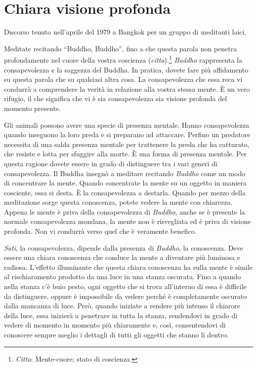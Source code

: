 \chapter{Chiara visione profonda}

\begin{openingQuote}
  \centering

  Discorso tenuto nell'aprile del 1979 a Bangkok per un gruppo di meditanti
  laici.
\end{openingQuote}

Meditate recitando ``Buddho, Buddho'', fino a che questa parola non
penetra profondamente nel cuore della vostra coscienza
(\emph{citta}).\footnote{\emph{Citta}: Mente-cuore; stato di coscienza.}
\emph{Buddho} rappresenta la consapevolezza e la saggezza del Buddha. In
pratica, dovete fare più affidamento su questa parola che su qualsiasi
altra cosa. La consapevolezza che essa reca vi condurrà a comprendere la
verità in relazione alla vostra stessa mente. È un vero rifugio, il che
significa che vi è sia consapevolezza sia visione profonda del momento
presente.

Gli animali possono avere una specie di presenza mentale. Hanno
consapevolezza quando inseguono la loro preda e si preparano ad
attaccare. Perfino un predatore necessita di una salda presenza mentale
per trattenere la preda che ha catturato, che resiste e lotta per
sfuggire alla morte. È una forma di presenza mentale. Per questa ragione
dovete essere in grado di distinguere tra i vari generi di
consapevolezza. Il Buddha insegnò a meditare recitando \emph{Buddho}
come un modo di concentrare la mente. Quando concentrate la mente su un
oggetto in maniera cosciente, essa si desta. È la consapevolezza a
destarla. Quando per mezzo della meditazione sorge questa conoscenza,
potete vedere la mente con chiarezza. Appena le mente è priva della
consapevolezza di \emph{Buddho}, anche se è presente la normale
consapevolezza mondana, la mente non è risvegliata ed è priva di visione
profonda. Non vi condurrà verso quel che è veramente benefico.

\emph{Sati}, la consapevolezza, dipende dalla presenza di \emph{Buddho},
la conoscenza. Deve essere una chiara conoscenza che conduce la mente a
diventare più luminosa e radiosa. L'effetto illuminante che questa
chiara conoscenza ha sulla mente è simile al rischiaramento prodotto da
una luce in una stanza oscurata. Fino a quando nella stanza c'è buio
pesto, ogni oggetto che si trova all'interno di essa è difficile da
distinguere, oppure è impossibile da vedere perché è completamente
oscurato dalla mancanza di luce. Però, quando iniziate a rendere più
intenso il chiarore della luce, essa inizierà a penetrare in tutta la
stanza, rendendovi in grado di vedere di momento in momento più
chiaramente e, così, consentendovi di conoscere sempre meglio i dettagli
di tutti gli oggetti che stanno lì dentro.

